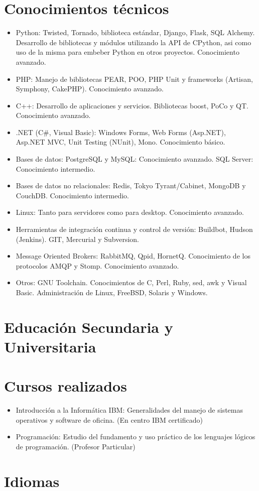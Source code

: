 \documentclass[a4paper,11pt]{moderncv}
\begin{document}
\section{Conocimientos t\'ecnicos}
\begin{itemize}
\item Python: Twisted, Tornado, biblioteca est\'andar, Django, Flask, SQL Alchemy. Desarrollo de bibliotecas y m\'odulos utilizando la API de CPython, asi como uso de la misma para embeber Python en otros proyectos. Conocimiento avanzado.
\item PHP: Manejo de bibliotecas PEAR, POO, PHP Unit y frameworks (Artisan, Symphony, CakePHP).  Conocimiento avanzado.
\item C++: Desarrollo de aplicaciones y servicios. Bibliotecas boost, PoCo y QT. Conocimiento avanzado.
\item .NET (C\#, Visual Basic): Windows Forms, Web Forms (Asp.NET), Asp.NET MVC, Unit Testing (NUnit), Mono. Conocimiento b\'asico.
\item Bases de datos: PostgreSQL y MySQL: Conocimiento avanzado. SQL Server: Conocimiento intermedio.
\item Bases de datos no relacionales: Redis, Tokyo Tyrant/Cabinet, MongoDB y CouchDB. Conocimiento intermedio.
\item Linux: Tanto para servidores como para desktop. Conocimiento avanzado.
\item Herramientas de integraci\'on continua y control de versi\'on: Buildbot, Hudson (Jenkins). GIT, Mercurial y Subversion.
\item Message Oriented Brokers: RabbitMQ, Qpid, HornetQ. Conocimiento de los protocolos AMQP y Stomp. Conocimiento avanzado.
\item Otros: GNU Toolchain. Conocimientos de C, Perl, Ruby, sed, awk y Visual Basic. Administraci\'on de Linux, FreeBSD, Solaris y Windows.
\end{itemize}

\section{Educaci\'on Secundaria y Universitaria}

\section{Cursos realizados}
\begin{itemize}
\item Introducci\'on a la Inform\'atica IBM: Generalidades del manejo de sistemas operativos y software de oficina. (En centro IBM certificado)
\item Programaci\'on: Estudio del fundamento y uso pr\'actico de los lenguajes l\'ogicos de programaci\'on. (Profesor Particular)
\end{itemize}

\section{Idiomas}
\end{document}
